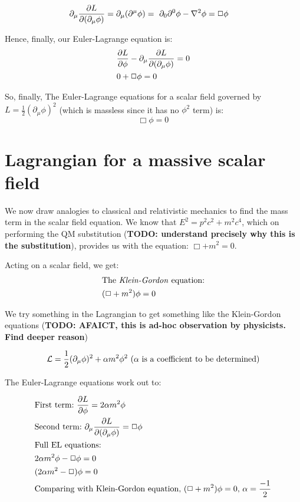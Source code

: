 \begin{align*}
    &\partial_\mu \pdv{L}{(\partial_\mu \phi)} = \partial_\mu (\partial^\mu \phi)
    =~\partial_0 \partial^0  \phi - \laplacian \phi = \Box \phi
\end{align*}

Hence, finally, our Euler-Lagrange equation is:
\begin{align*}
    &\pdv{L}{\phi} -  \partial_\mu \pdv{L}{(\partial_\mu \phi)} = 0 \\
    &0 + \Box \phi  = 0
\end{align*}

So, finally, The Euler-Lagrange equations for a scalar field governed by $L =
\frac{1}{2} (\partial_\mu \phi)^2$ (which is massless since it has no $\phi^2$
term) is:
\begin{equation}
    \boxed{\Box \phi  = 0}
 \end{equation}
\section{Lagrangian for a massive scalar field}
We now draw analogies to classical and relativistic mechanics to find
the mass term in the scalar field equation. We know that
$E^2 = p^2 c^2 + m^2 c^4$, which on performing the QM substitution
(\textbf{TODO: understand precisely why this is the substitution}), provides
us with the equation:  $\Box + m^2 = 0$.

Acting on a scalar field, we get:
\begin{align*}
    &\text{The \textit{Klein-Gordon} equation:}\\
    &(\Box + m^2) \phi = 0
\end{align*}

We try something in the Lagrangian to get something like the Klein-Gordon
equations (\textbf{TODO: AFAICT, this is ad-hoc observation by physicists. Find deeper reason})

\begin{align*}
    &\mathcal{L} = \frac{1}{2} (\partial_\mu \phi)^2 + \alpha m^2 \phi^2~\text{($\alpha$ is a coefficient to be determined)} \\
\end{align*}

The Euler-Lagrange equations work out to:

\begin{align*}
    &\text{First term:}
    ~\pdv{L}{\phi} =  2 \alpha m^2 \phi\\
    &\text{Second term:}
    ~\partial_\mu \pdv{L}{(\partial_\mu \phi)} = \Box \phi \\
    &\text{Full EL equations:} \\
    &2 \alpha m^2 \phi - \Box \phi = 0 \\
    &(2 \alpha m^2 - \Box) \phi = 0 \\
    &\text{Comparing with Klein-Gordon equation, $(\Box + m^2) \phi = 0$, $\alpha = \frac{-1}{2}$}
\end{align*}

